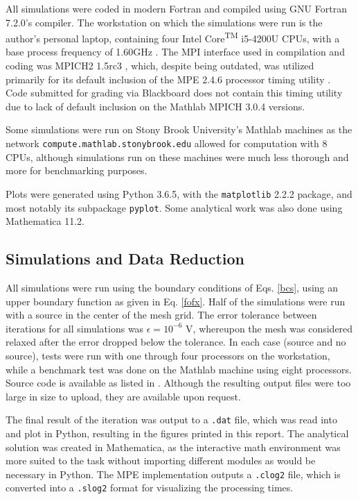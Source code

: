 \documentclass[reprint, amsmath, amssymb, aps, floatfix]{revtex4-1}
\def\inline{\lstinline[basicstyle=\ttfamily,keywordstyle={}]}
\begin{document}
All simulations were coded in modern Fortran and compiled using GNU Fortran 7.2.0's compiler. The workstation on which the simulations were run is the author's personal laptop, containing four Intel\textsuperscript{\textregistered}  Core\textsuperscript{TM} i5-4200U CPUs, with a base process frequency of 1.60GHz \cite{intel}. The MPI interface used in compilation and coding was MPICH2 1.5rc3 \cite{mpich}, which, despite being outdated, was utilized primarily for its default inclusion of the MPE 2.4.6 processor timing utility \cite{mpe}. Code submitted for grading via Blackboard does not contain this timing utility due to lack of default inclusion on the Mathlab MPICH 3.0.4 versions.

Some simulations were run on Stony Brook University's Mathlab machines as the network \inline{compute.mathlab.stonybrook.edu} allowed for computation with 8 CPUs, although simulations run on these machines were much less thorough and more for benchmarking purposes. 

Plots were generated using Python 3.6.5, with the \inline{matplotlib} 2.2.2 package, and most notably its subpackage \inline{pyplot}. Some analytical work was also done using Mathematica 11.2.

\subsection{Simulations and Data Reduction}

All simulations were run using the boundary conditions of Eqs. \eqref{bcs}, using an upper boundary function as given in Eq. \eqref{fofx}. Half of the simulations were run with a source in the center of the mesh grid. The error tolerance between iterations for all simulations was $\epsilon=10^{-6}$ V, whereupon the mesh was considered relaxed after the error dropped below the tolerance. In each case (source and no source), tests were run with one through four processors on the workstation, while a benchmark test was done on the Mathlab machine using eight processors. Source code is available as listed in \cite{git}. Although the resulting output files were too large in size to upload, they are available upon request.

The final result of the iteration was output to a \inline{.dat} file, which was read into and plot in Python, resulting in the figures printed in this report. The analytical solution was created in Mathematica, as the interactive math environment was more suited to the task without importing different modules as would be necessary in Python. The MPE implementation outputs a \inline{.clog2} file, which is converted into a \inline{.slog2} format for visualizing the processing times.
\end{document}
